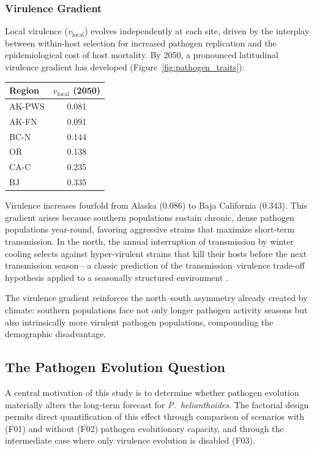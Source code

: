 \subsubsection{Virulence Gradient}

Local virulence ($v_\mathrm{local}$) evolves independently at each
site, driven by the interplay between within-host selection for
increased pathogen replication and the epidemiological cost of host
mortality.  By 2050, a pronounced latitudinal virulence gradient has
developed (Figure~\ref{fig:pathogen_traits}):

\begin{center}
\begin{tabular}{lc}
\toprule
\textbf{Region} & $v_\mathrm{local}$ (2050) \\
\midrule
AK-PWS & 0.081 \\
AK-FN  & 0.091 \\
BC-N   & 0.144 \\
OR     & 0.138 \\
CA-C   & 0.235 \\
BJ     & 0.335 \\
\bottomrule
\end{tabular}
\end{center}

\noindent
Virulence increases fourfold from Alaska (0.086) to Baja California
(0.343).  This gradient arises because southern populations sustain
chronic, dense pathogen populations year-round, favoring
aggressive strains that maximize short-term transmission.  In the
north, the annual interruption of transmission by winter cooling
selects against hyper-virulent strains that kill their hosts before the
next transmission season---a classic prediction of the
transmission--virulence trade-off hypothesis applied to a seasonally
structured environment \citep{alizon2009}.

The virulence gradient reinforces the north--south asymmetry already
created by climate: southern populations face not only longer pathogen
activity seasons but also intrinsically more virulent pathogen
populations, compounding the demographic disadvantage.

\subsection{The Pathogen Evolution Question}
\label{sec:pathogen_evo}

A central motivation of this study is to determine whether pathogen
evolution materially alters the long-term forecast for
\textit{P.~helianthoides}.  The factorial design permits direct
quantification of this effect through comparison of scenarios with
(F01) and without (F02) pathogen evolutionary capacity, and through the
intermediate case where only virulence evolution is disabled (F03).

